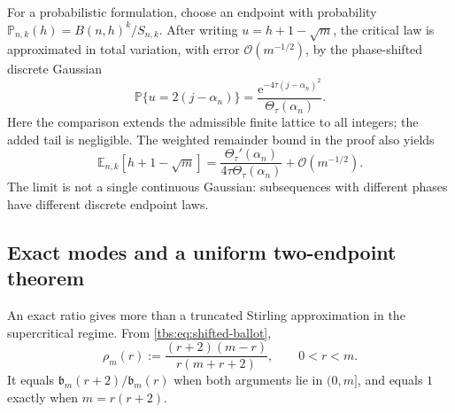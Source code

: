 \documentclass[11pt,a4paper]{article}
\numberwithin{equation}{section}
\theoremstyle{definition}
\newcommand{\bcont}{\mathfrak b}
\newcommand{\ee}{\mathrm e}
\newcommand{\OO}{\mathcal O}
\begin{document}
For a probabilistic formulation, choose an endpoint with probability
$\mathbb P_{n,k}(h)=B(n,h)^k/S_{n,k}$. After writing $u=h+1-\sqrt m$,
the critical law is approximated in total variation, with error
$\OO(m^{-1/2})$, by the phase-shifted discrete Gaussian
\begin{equation}\label{tbs:eq:discrete-law}
 \mathbb P\{u=2(j-\alpha_n)\}
 =\frac{\ee^{-4\tau(j-\alpha_n)^2}}{\Theta_\tau(\alpha_n)}.
\end{equation}
Here the comparison extends the admissible finite lattice to all integers;
the added tail is negligible. The weighted remainder bound in the proof
also yields
\begin{equation}\label{tbs:eq:mean-endpoint}
 \mathbb E_{n,k}[h+1-\sqrt m]
 =\frac{\Theta_\tau'(\alpha_n)}{4\tau\Theta_\tau(\alpha_n)}
  +\OO(m^{-1/2}).
\end{equation}
The limit is not a single continuous Gaussian: subsequences with different
phases have different discrete endpoint laws.

\subsection{Exact modes and a uniform two-endpoint theorem}
An exact ratio gives more than a truncated Stirling approximation in the
supercritical regime. From \eqref{tbs:eq:shifted-ballot},
\begin{equation}\label{tbs:eq:exact-ratio}
 \rho_m(r):=\frac{(r+2)(m-r)}{r(m+r+2)},\qquad 0<r<m.
\end{equation}
It equals $\bcont_m(r+2)/\bcont_m(r)$ when both arguments lie in
$(0,m]$, and equals $1$ exactly when $m=r(r+2)$.
\end{document}
